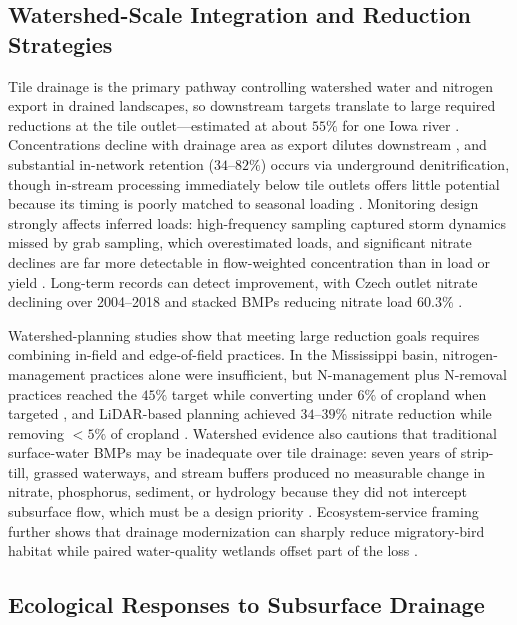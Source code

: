 \subsection{Watershed-Scale Integration and Reduction Strategies}

Tile drainage is the primary pathway controlling watershed water and nitrogen
export in drained landscapes, so downstream targets translate to large
required reductions at the tile outlet---estimated at about $55\%$ for one
Iowa river \parencite{Schilling2012b,Ikenberry2014}. Concentrations decline
with drainage area as export dilutes downstream \parencite{Schilling2012b,Billy2013},
and substantial in-network retention ($34$--$82\%$) occurs via underground
denitrification, though in-stream processing immediately below tile outlets
offers little potential because its timing is poorly matched to seasonal
loading \parencite{Billy2011,Schilling2012b}. Monitoring design strongly
affects inferred loads: high-frequency sampling captured storm dynamics missed
by grab sampling, which overestimated loads, and significant nitrate declines
are far more detectable in flow-weighted concentration than in load or yield
\parencite{Drake2018,Danalatos2022,Irvine2019}. Long-term records can detect
improvement, with Czech outlet nitrate declining over 2004--2018 and stacked
BMPs reducing nitrate load $60.3\%$ \parencite{Fraindová2022,Law2022}.

Watershed-planning studies show that meeting large reduction goals requires
combining in-field and edge-of-field practices. In the Mississippi basin,
nitrogen-management practices alone were insufficient, but N-management plus
N-removal practices reached the $45\%$ target while converting under $6\%$ of
cropland when targeted \parencite{McLellan2015}, and LiDAR-based planning
achieved $34$--$39\%$ nitrate reduction while removing $<5\%$ of cropland
\parencite{Tomer2015,Kvítek2023}. Watershed evidence also cautions that
traditional surface-water BMPs may be inadequate over tile drainage: seven
years of strip-till, grassed waterways, and stream buffers produced no
measurable change in nitrate, phosphorus, sediment, or hydrology because they
did not intercept subsurface flow, which must be a design priority
\parencite{Lemke2011}. Ecosystem-service framing further shows that drainage
modernization can sharply reduce migratory-bird habitat while paired
water-quality wetlands offset part of the loss
\parencite{Mitchell2022,Mitchell2025,Dollinger2015}.

\subsection{Ecological Responses to Subsurface Drainage}

